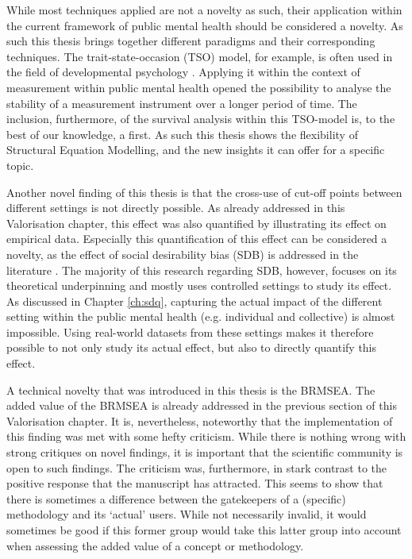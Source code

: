 While most techniques applied are not a novelty as such, their application within the current framework of public mental health should be considered a novelty. 
As such this thesis brings together different paradigms and their corresponding techniques. 
The trait-state-occasion (TSO) model, for example, is often used in the field of developmental psychology \parencite{Cole_2012}. 
Applying it within the context of measurement within public mental health opened the possibility to analyse the stability of a measurement instrument over a longer period of time. 
The inclusion, furthermore, of the survival analysis within this TSO-model is, to the best of our knowledge, a first. 
As such this thesis shows the flexibility of Structural Equation Modelling, and the new insights it can offer for a specific topic. 

Another novel finding of this thesis is that the cross-use of cut-off points between different settings is not directly possible. As already addressed in this Valorisation chapter, this effect was also quantified by illustrating its effect on empirical data. 
Especially this quantification of this effect can be considered a novelty, as the effect of social desirability bias (SDB) is addressed in the literature \parencite{Krumpal_2013}. 
The majority of this research regarding SDB, however, focuses on its theoretical underpinning and mostly uses controlled settings to study its effect. 
As discussed in Chapter \ref{ch:sdq}, capturing the actual impact of the different setting within the public mental health (e.g. individual and collective) is almost impossible. 
Using real-world datasets from these settings makes it therefore possible to not only study its actual effect, but also to directly quantify this effect. 

A technical novelty that was introduced in this thesis is the BRMSEA. 
The added value of the BRMSEA is already addressed in the previous section of this Valorisation chapter.
It is, nevertheless, noteworthy that the implementation of this finding was met with some hefty criticism.
While there is nothing wrong with strong critiques on novel findings, it is important that the scientific community is open to such findings. 
The criticism was, furthermore, in stark contrast to the positive response that the manuscript has attracted. 
This seems to show that there is sometimes a difference between the gatekeepers of a (specific) methodology and its `actual' users. 
While not necessarily invalid, it would sometimes be good if this former group would take this latter group into account when assessing the added value of a concept or methodology.   

